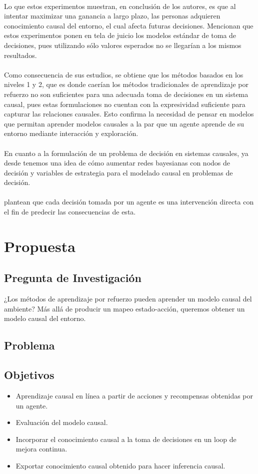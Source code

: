 \documentclass[11pt]{article}
\theoremstyle{plain}
\begin{document}
\\
Lo que estos experimentos muestran, en conclusión de los autores, es que al intentar maximizar una ganancia a largo plazo, las personas adquieren conocimiento causal del entorno, el cual afecta futuras decisiones. Mencionan que estos experimentos ponen en tela de juicio los modelos estándar de toma de decisiones, pues utilizando sólo valores esperados no se llegarían a los mismos resultados.\\
\\
Como consecuencia de sus estudios, se obtiene que los métodos basados en los niveles 1 y 2, que es donde caerían los métodos tradicionales de aprendizaje por refuerzo no son suficientes para una adecuada toma de decisiones en un sistema causal, pues estas formulaciones no cuentan con la expresividad suficiente para capturar las relaciones causales. Esto confirma la necesidad de pensar en modelos que permitan aprender modelos causales a la par que un agente aprende de su entorno mediante interacción y exploración.\\
\\
En cuanto a la formulación de un problema de decisión en sistemas causales, ya desde \cite{dawid2002influence} tenemos una idea de cómo aumentar redes bayesianas con nodos de decisión y variables de estrategia para el modelado causal en problemas de decisión.\\
\\
\cite{hagmayer2009decision} plantean que cada decisión tomada por un agente es una intervención directa con el fin de predecir las consecuencias de esta. 
\section{Propuesta}
\subsection{Pregunta de Investigación}
¿Los métodos de aprendizaje por refuerzo pueden aprender un modelo causal del ambiente? Más allá de producir un mapeo estado-acción, queremos obtener un modelo causal del entorno.
\subsection{Problema}
\subsection{Objetivos}
\begin{itemize}
\item Aprendizaje causal en línea a partir de acciones y recompensas obtenidas por un agente.
\item Evaluación del modelo causal.
\item Incorporar el conocimiento causal a la toma de decisiones en un loop de mejora continua.
\item Exportar conocimiento causal obtenido para hacer inferencia causal.
\end{itemize}
\end{document}
